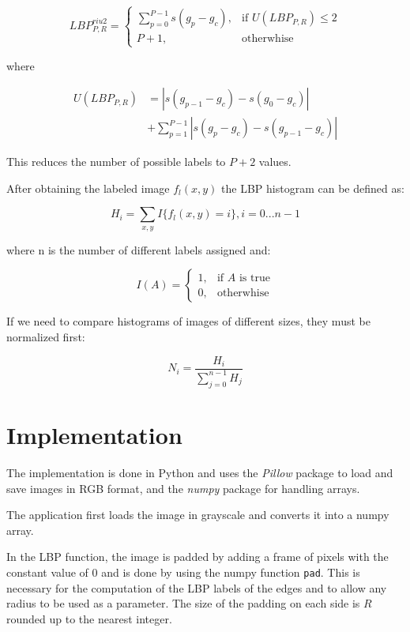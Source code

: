 \documentclass[10pt,twocolumn,letterpaper]{article}
\begin{document}
\[LBP_{P, R}^{riu2} = \begin{cases} \sum_{p = 0}^{P - 1}s(g_p - g_c), & \mbox{if } U(LBP_{P, R}) \le 2 \\ P + 1, & \mbox{otherwhise} \end{cases}\]

where

\begin{equation*}
	\begin{split} 
		U(LBP_{P, R}) & = |s(g_{p - 1} - g_c) - s(g_0 - g_c)| \\ & + \sum_{p = 1}^{P - 1}|s(g_p - g_c) - s(g_{p -1} - g_c)|
	\end{split}
\end{equation*}

This reduces the number of possible labels to $P + 2$ values.

After obtaining the labeled image $f_l(x, y)$ the LBP histogram can be defined as:

\[H_i = \sum_{x, y}I\{f_l(x, y) = i\}, i = 0...n -1\]

where n is the number of different labels assigned and:

\[I(A) = \begin{cases} 1, & \mbox{if } A \mbox{ is true} \\ 0, & \mbox{otherwhise} \end{cases}\]

If we need to compare histograms of images of different sizes, they must be normalized first:

\[N_i = \frac{H_i}{\sum_{j = 0}^{n - 1}H_j}\]

\section{Implementation}

The implementation is done in Python and uses the \textit{Pillow} package to load and save images in RGB format, and the \textit{numpy} package for handling arrays. 

The application first loads the image in grayscale and converts it into a numpy array.

In the LBP function, the image is padded by adding a frame of pixels with the constant value of 0 and is done by using the numpy function \verb"pad". This is necessary for the computation of the LBP labels of the edges and to allow any radius to be used as a parameter. The size of the padding on each side is $R$ rounded up to the nearest integer.
\end{document}
